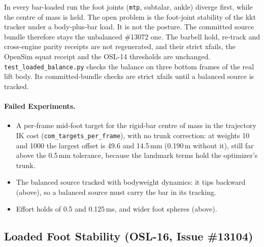 \documentclass[11pt,a4paper]{article}
\begin{document}
In every bar-loaded run the foot joints (\texttt{mtp}, subtalar, ankle)
diverge first, while the centre of mass is held. The open problem is the
foot-joint stability of the kkt tracker under a body-plus-bar load. It is not
the posture. The committed source bundle therefore stays the unbalanced
\#13072 one. The barbell hold, re-track and cross-engine parity receipts are
not regenerated, and their strict xfails, the OpenSim squat receipt and the
OSL-14 thresholds are unchanged. \texttt{test\_loaded\_balance.py} checks the
balance on three bottom frames of the real lift body. Its committed-bundle
checks are strict xfails until a balanced source is tracked.

\paragraph{Failed Experiments.}
\begin{itemize}[nosep]
\item A per-frame mid-foot target for the rigid-bar centre of mass in the
  trajectory IK cost (\texttt{com\_targets\_per\_frame}), with no trunk
  correction: at weights 10 and 1000 the largest offset is 49.6 and 14.5\,mm
  (0.190\,m without it), still far above the 0.5\,mm tolerance, because the
  landmark terms hold the optimizer's trunk.
\item The balanced source tracked with bodyweight dynamics: it tips backward
  (above), so a balanced source must carry the bar in its tracking.
\item Effort holds of 0.5 and 0.125\,ms, and wider foot spheres (above).
\end{itemize}

\subsection{Loaded Foot Stability (OSL-16, Issue \#13104)}
\end{document}

